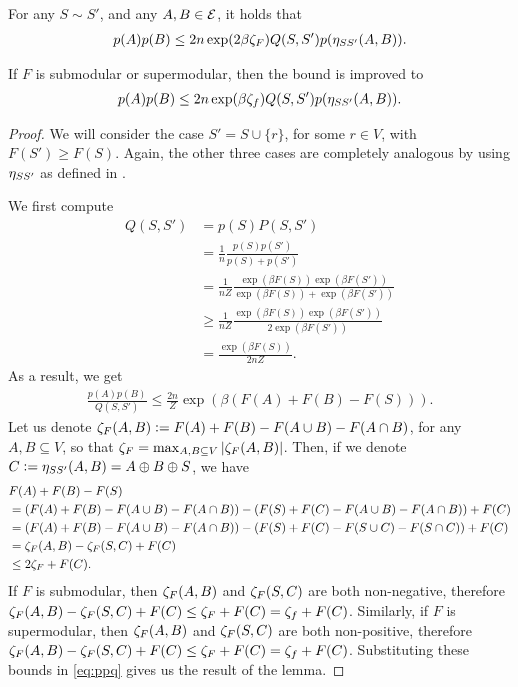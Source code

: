 \setcounter{lemma}{0}
\begin{lemma} \label{lem:poly_full}
  For any $S \sim S'$, and any $A, B \in \ss$, it holds that
  \begin{align*}
    p(A)p(B) \leq 2n\exp(2 \beta \zf)Q(S, S')p(\ess(A, B)).
  \end{align*}
  
  If $F$ is submodular or supermodular, then the bound is improved to
  \begin{align*}
  	p(A)p(B) \leq 2n\exp(\beta \zeta_f)Q(S, S')p(\ess(A, B)).
  \end{align*}
\end{lemma}

\begin{proof}
  We will consider the case $S' = S \cup \{r\}$, for some $r \in V$, with $F(S') \geq F(S)$.
  Again, the other three cases are completely analogous by using $\ess$ as defined in .
  
  We first compute
  \begin{align*}
    Q(S, S') &= p(S)P(S, S')\\
             &= \frac{1}{n}\frac{p(S)p(S')}{p(S) + p(S')} \tag*{by definition of the Gibbs sampler}\\
             &= \frac{1}{nZ}\frac{\exp(\beta F(S)) \exp(\beta F(S'))}{\exp(\beta F(S)) + \exp(\beta F(S'))} \tag*{by definition of our models}\\
             &\geq \frac{1}{nZ}\frac{\exp(\beta F(S)) \exp(\beta F(S'))}{2\exp(\beta F(S'))} \tag*{by $F(S') \geq F(S)$}\\
             &= \frac{\exp(\beta F(S))}{2nZ}.
  \end{align*}
  As a result, we get
  \begin{align} \label{eq:ppq}
    \frac{p(A)p(B)}{Q(S, S')} \leq \frac{2n}{Z}\exp(\beta (F(A) + F(B) - F(S))).
  \end{align}
  Let us denote $\zf(A, B) \defeq F(A) + F(B) - F(A \cup B) - F(A \cap B)$, for any $A, B \subseteq V$, so that $\zf = \max_{A, B \subseteq V}|\zf(A, B)|$.
  Then, if we denote $C \defeq \ess(A, B) = A \oplus B \oplus S$, we have
  \begin{align*}
    &F(A) + F(B) - F(S)\\
    &= (F(A) + F(B) - F(A \cup B) - F(A \cap B)) - (F(S) + F(C) - F(A \cup B) - F(A \cap B)) + F(C)\\
    &= (F(A) + F(B) - F(A \cup B) - F(A \cap B)) - (F(S) + F(C) - F(S \cup C) - F(S \cap C)) + F(C)\\
    &= \zf(A, B) - \zf(S, C) + F(C)\\
    &\leq 2\zf + F(C).
  \end{align*}
  If $F$ is submodular, then $\zf(A, B)$ and $\zf(S, C)$ are both non-negative, therefore $\zf(A, B) - \zf(S, C) + F(C) \leq \zf + F(C) = \zeta_f + F(C)$.
  Similarly, if $F$ is supermodular, then $\zf(A, B)$ and $\zf(S, C)$ are both non-positive, therefore $\zf(A, B) - \zf(S, C) + F(C) \leq \zf + F(C) = \zeta_f + F(C)$.
  Substituting these bounds in \eqref{eq:ppq} gives us the result of the lemma.
\end{proof}

